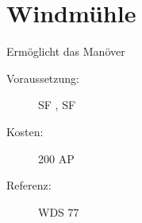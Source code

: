\section{Windmühle}
\label{sf.windmuehle}
Ermöglicht das Manöver 
\begin{description}
    \item[Voraussetzung:]
        SF , SF 
    \item [Kosten:]
        200 AP
    \item [Referenz:]
        WDS 77
\end{description}
